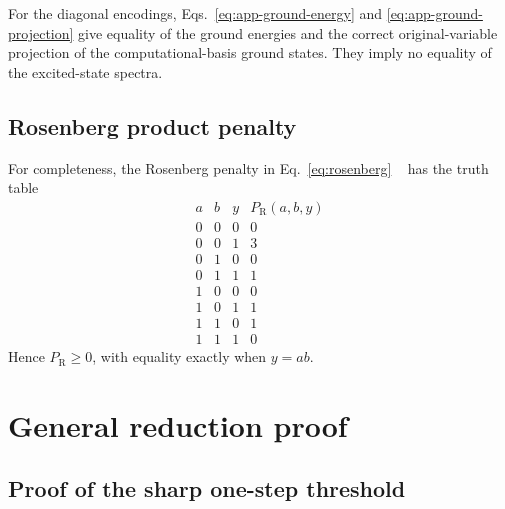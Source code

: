 \documentclass[a4paper,onecolumn,11pt,unpublished]{quantumarticle}
\theoremstyle{remark}
\begin{document}
For the diagonal encodings, Eqs.~\eqref{eq:app-ground-energy} and
\eqref{eq:app-ground-projection} give equality of the ground energies and the
correct original-variable projection of the computational-basis ground states.
They imply no equality of the excited-state spectra.

\subsection{Rosenberg product penalty}
\label{app:rosenberg-table}

For completeness, the Rosenberg penalty in Eq.~\eqref{eq:rosenberg}
~\cite{Rosenberg1975} has the
truth table
\begin{equation}
\begin{array}{ccc|c}
 a&b&y&P_{\mathrm R}(a,b,y)\\ \hline
 0&0&0&0\\
 0&0&1&3\\
 0&1&0&0\\
 0&1&1&1\\
 1&0&0&0\\
 1&0&1&1\\
 1&1&0&1\\
 1&1&1&0
\end{array}
\label{eq:app-rosenberg-table}
\end{equation}
Hence \(P_{\mathrm R}\geq0\), with equality exactly when \(y=ab\).




\section{General reduction proof}
\label{app:general-reduction-proof}

\subsection{Proof of the sharp one-step threshold}
\label{app:sharp-one-step-proof}
\end{document}
